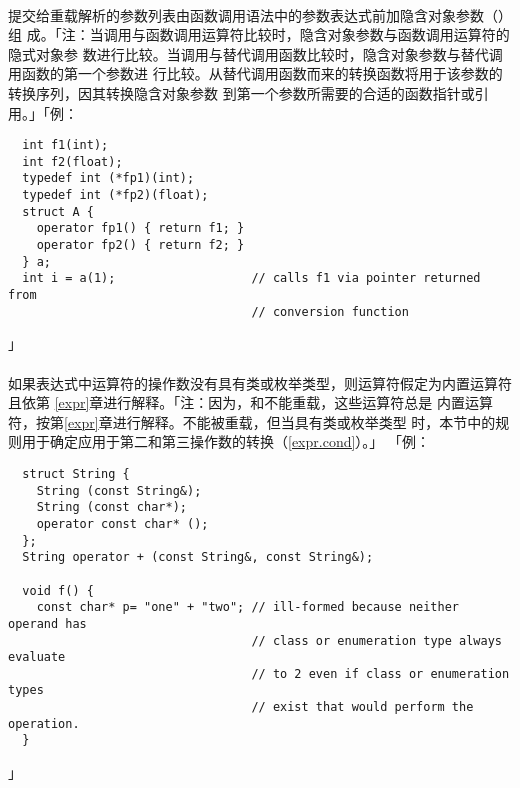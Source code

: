 \paragraph{}
提交给重载解析的参数列表由函数调用语法中的参数表达式前加隐含对象参数（）组
成。「注：当调用与函数调用运算符比较时，隐含对象参数与函数调用运算符的隐式对象参
数进行比较。当调用与替代调用函数比较时，隐含对象参数与替代调用函数的第一个参数进
行比较。从替代调用函数而来的转换函数将用于该参数的转换序列，因其转换隐含对象参数
到第一个参数所需要的合适的函数指针或引用。」「例：
\begin{lstlisting}
  int f1(int);
  int f2(float);
  typedef int (*fp1)(int);
  typedef int (*fp2)(float);
  struct A {
    operator fp1() { return f1; }
    operator fp2() { return f2; }
  } a;
  int i = a(1);                   // calls f1 via pointer returned from
                                  // conversion function
\end{lstlisting}」

\paragraph{}
如果表达式中运算符的操作数没有具有类或枚举类型，则运算符假定为内置运算符且依第
\ref{expr}章进行解释。「注：因为，和\tm{::}不能重载，这些运算符总是
内置运算符，按第\ref{expr}章进行解释。不能被重载，但当具有类或枚举类型
时，本节中的规则用于确定应用于第二和第三操作数的转换（\ref{expr.cond}）。」
「例：
\begin{lstlisting}
  struct String {
    String (const String&);
    String (const char*);
    operator const char* ();
  };
  String operator + (const String&, const String&);

  void f() {
    const char* p= "one" + "two"; // ill-formed because neither operand has
                                  // class or enumeration type always evaluate
                                  // to 2 even if class or enumeration types
                                  // exist that would perform the operation.
  }
\end{lstlisting}」

